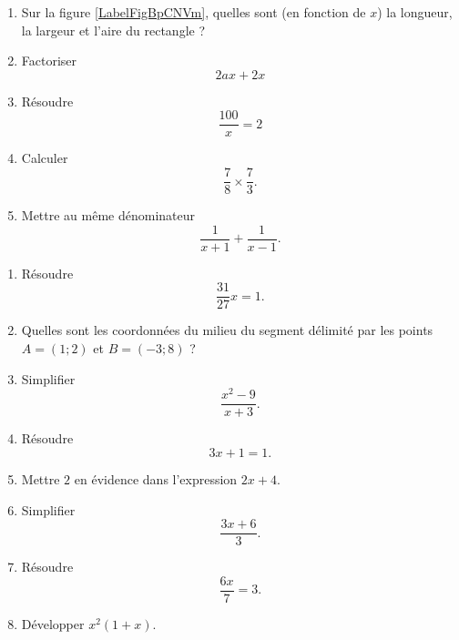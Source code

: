 \begin{exercice}
\begin{multicols}{2}
\begin{enumerate}
        \item
Sur la figure \ref{LabelFigBpCNVm}, quelles sont (en fonction de \( x\)) la longueur, la largeur et l'aire du rectangle ?

        \item
            Factoriser
            \begin{equation}
                2ax+2x   
            \end{equation}
        \item
            Résoudre
            \begin{equation}
                \frac{ 100 }{ x }=2
            \end{equation}
        \item
            Calculer
            \begin{equation}
                \frac{ 7 }{ 8 }\times\frac{ 7 }{ 3 }.
            \end{equation}
        \item
            Mettre au même dénominateur
            \begin{equation}
                \frac{1}{ x+1 }+\frac{1}{ x-1 }.
            \end{equation}
        \end{enumerate}
        \begin{enumerate}

        \item
            Résoudre
            \begin{equation}
                \frac{ 31 }{ 27 }x=1.
            \end{equation}
        \item
            Quelles sont les coordonnées du milieu du segment délimité par les points \( A=(1;2)\) et \( B=(-3;8)\) ?
        \item
            Simplifier
            \begin{equation}
                \frac{ x^2-9 }{ x+3 }.
            \end{equation}
        \item
            Résoudre
            \begin{equation}
                3x+1=1.
            \end{equation}

        \item
            Mettre \( 2\) en évidence dans l'expression \( 2x+4\).
        \item
            Simplifier
            \begin{equation}
                \frac{ 3x+6 }{ 3 }.
            \end{equation}
        \item
            Résoudre
            \begin{equation}
                \frac{ 6x }{ 7 }=3.
            \end{equation}
        \item
            Développer \( x^2(1+x)\).


\end{enumerate}
\end{multicols}
\end{exercice}
